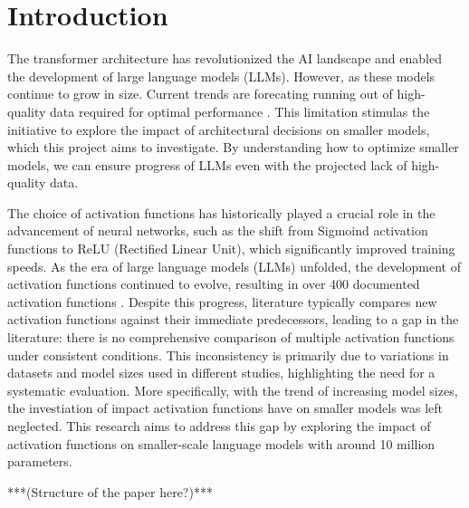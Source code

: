 
\section{Introduction}


The transformer architecture \cite{Vaswani2017} has revolutionized the AI landscape and enabled the development of large language models (LLMs). However, as these models continue to grow in size. Current trends are forecating running out of high-quality data required for optimal performance \cite{Villalobos2022}. This limitation stimulas the initiative to explore the impact of architectural decisions on smaller models, which this project aims to investigate. By understanding how to optimize smaller models, we can ensure progress of LLMs even with the projected lack of high-quality data.

The choice of activation functions has historically played a crucial role in the advancement of neural networks, such as the shift from Sigmoind activation functions to ReLU (Rectified Linear Unit), which significantly improved training speeds. As the era of large language models (LLMs) unfolded, the development of activation functions continued to evolve, resulting in over 400 documented activation functions \cite{Kunc2024}. Despite this progress, literature typically compares new activation functions against their immediate predecessors, leading to a gap in the literature: there is no comprehensive comparison of multiple activation functions under consistent conditions. This inconsistency is primarily due to variations in datasets and model sizes used in different studies, highlighting the need for a systematic evaluation. More specifically, with the trend of increasing model sizes, the investiation of impact activation functions have on smaller models was left neglected. This research aims to address this gap by exploring the impact of activation functions on smaller-scale language models with around 10 million parameters.

***(Structure of the paper here?)***